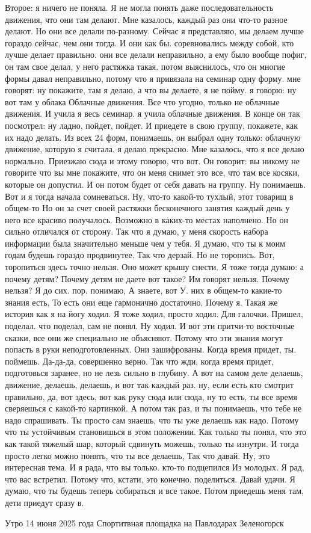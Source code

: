 Второе: я ничего не поняла.
Я не могла понять даже последовательность движения, что они там делают.
Мне казалось, каждый раз они что-то разное делают.
Но они все делали по-разному.
Сейчас я представляю, мы делаем лучше гораздо сейчас, чем они тогда.
И они как бы.
соревновались между собой, кто лучше делает правильно. они все делали неправильно, а ему было вообще пофиг, он там свое делал, у него растяжка такая. потом выяснилось, что он многие формы давал неправильно, потому что я привязала на семинар одну форму.
мне говорят: ну покажите, там я делаю, а что вы делаете, я не пойму. я говорю: ну вот там у облака Облачные движения.
Все что угодно, только не облачные движения.
И учила я весь семинар. я учила облачные движения.
В конце он так посмотрел: ну ладно, пойдет, пойдет.
И приедете в свою группу, покажете, как их надо делать.
Из всех 24 форм, понимаешь, он выбрал одну только: облачную движение, которую я считала. я делаю прекрасно.
Мне казалось, что я все делаю нормально.
Приезжаю сюда и этому говорю, что вот.
Он говорит: вы никому не говорите что вы мне покажите, что он меня снимет это все, что там все косяки, которые он допустил.
И он потом будет от себя давать на группу.
Ну понимаешь.
Вот и я тогда начала сомневаться.
Ну, что-то какой-то тухлый, этот товарищ в общем-то
Но он за счет своей растяжки бесконечного занятия каждый день у него все красиво получалось.
Возможно в каких-то местах наполнено.
Но он сильно отличался от сторону.
Так что я думаю, у меня скорость набора информации была значительно меньше чем у тебя.
Я думаю, что ты к моим годам будешь гораздо продвинутее.
Так что дерзай.
Но не торопись.
Вот, торопиться здесь точно нельзя.
Оно может крышу снести.
Я тоже тогда думаю: а почему детям?
Почему детям не даете вот такое?
Им говорят нельзя.
Почему нельзя?
Я до сих. пор.
понимаю, А знаете, вот У.
них в общем-то какие-то знания есть, То есть они еще гармонично достаточно.
Почему я.
Такая же история как я на йогу ходил.
Я тоже ходил, просто ходил.
Для галочки.
Пришел, поделал. что поделал, сам не понял.
Ну ходил.
И вот эти притчи-то восточные сказки, все они же специально не объясняют.
Потому что эти знания могут попасть в руки неподготовленных.
Они зашифрованы.
Когда время придет, ты.
поймешь.
Да-да-да, совершенно верно.
Так что жди, когда время придет, подготовься заранее, но не лезь сильно в глубину.
А вот на самом деле делаешь, движение, делаешь, делаешь, и вот так каждый раз. ну, если есть кто смотрит правильно, да, вот здесь, вот как руку сюда или сюда, ну то есть, ты все время сверяешься с какой-то картинкой.
А потом так раз, и ты понимаешь, что тебе не надо спрашивать.
Ты просто сам знаешь, что ты уже делаешь как надо.
Потому что ты устойчивым становишься в этом положении.
Как только ты понял, что это как такой тяжелый шар, который сдвинуть можешь, только ты изнутри.
И тогда просто легко можно понять, что ты все делаешь, Так что давай.
Ну, это интересная тема.
И я рада, что вы только.
кто-то подцепился Из молодых. Я рад, что вас встретил.
Потому что, кстати, это конечно.
поделиться. Давай удачи. Я думаю, что ты будешь теперь собираться и все такое. Потом приедешь меня там, дети приедут сразу в.

Утро 14 июня 2025 года
Спортитвная площадка на Павлодарах
Зеленогорск
\bye
